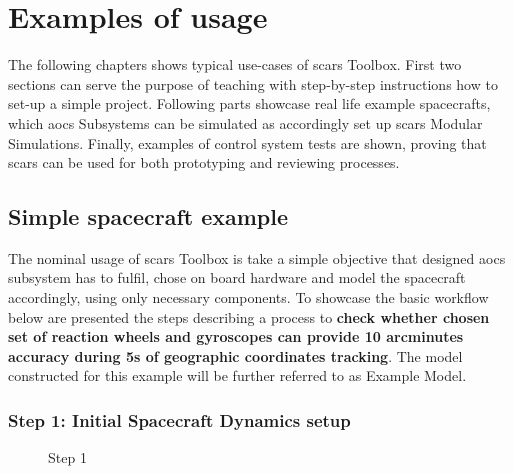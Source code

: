 \section{Examples of usage}\label{sec:examples}
    The following chapters shows typical use-cases of \ac{scars} Toolbox. First two sections can serve the purpose of teaching with step-by-step instructions how to set-up a simple project. Following parts showcase real life example spacecrafts, which \ac{aocs} Subsystems can be simulated as accordingly set up \ac{scars} Modular Simulations. Finally, examples of control system tests are shown, proving that \ac{scars} can be used for both prototyping and reviewing processes.


    \subsection{Simple spacecraft example}\label{sec:simple_spacecraft}
        The nominal usage of \ac{scars} Toolbox is take a simple objective that designed \ac{aocs} subsystem has to fulfil, chose on board hardware and model the spacecraft accordingly, using only necessary components. To showcase the basic workflow below are presented the steps describing a process to \textbf{check whether chosen set of reaction wheels and gyroscopes can provide 10 arcminutes accuracy during 5s of geographic coordinates tracking}. The model constructed for this example will be further referred to as Example Model. 

        \subsubsection*{Step 1: Initial Spacecraft Dynamics setup}
            \begin{figure}[H]
                \centering
                \qquad
                \caption{Step 1}%
                \label{fig:step1}%
            \end{figure}

